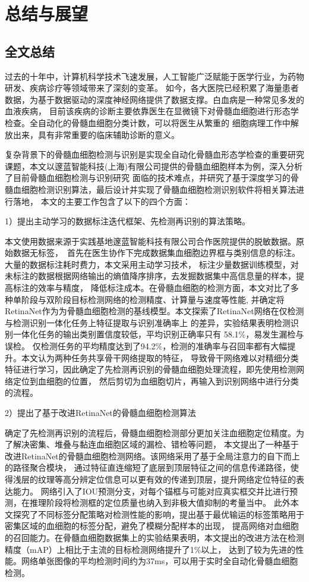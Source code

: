 \chapter{总结与展望}
\section{全文总结}
过去的十年中，计算机科学技术飞速发展，人工智能广泛赋能于医学行业，为药物研发、疾病诊疗等领域带来了深刻的变革。
如今，各大医院已经积累了海量患者数据，为基于数据驱动的深度神经网络提供了数据支撑。白血病是一种常见多发的血液疾病，
目前该疾病的诊断主要依靠医生在显微镜下对骨髓血细胞进行形态学检查。全自动化的骨髓血细胞分类计数，可以将医生从繁重的
细胞病理工作中解放出来，具有非常重要的临床辅助诊断的意义。

复杂背景下的骨髓血细胞检测与识别是实现全自动化骨髓血形态学检查的重要研究课题，本文以邃蓝智能科技(上海)有限公司提供的骨髓血细胞样本为例，深入分析了目前骨髓血细胞检测与识别研究
面临的技术难点，并研究了基于深度学习的骨髓血细胞检测识别算法，最后设计并实现了骨髓血细胞检测识别软件将相关算法进行落地，
本文的主要工作包含了以下的四个方面：

1）提出主动学习的数据标注迭代框架、先检测再识别的算法策略。

本文使用数据来源于实践基地邃蓝智能科技有限公司合作医院提供的脱敏数据。原始数据无标签，\
首先在医生协作下完成数据集血细胞边界框与类别信息的标注。大量的数据标注耗时费力，本文采用主动学习技术，
标注少量数据训练模型，对未标注的数据根据网络输出的熵值降序排序，去发掘数据集中高信息量的样本，提高标注的效率与精度，
降低标注成本。在骨髓血细胞的检测方面，本文对比了多种单阶段与双阶段目标检测网络的检测精度、计算量与速度等性能,
并确定将RetinaNet作为为骨髓血细胞检测的基线模型。本文探索了RetinaNet网络在仅检测与检测识别一体化任务上特征提取与识别准确率上
的差异，实验结果表明检测识别一体化任务的输出类别置信度较低，平均识别正确率只有 58.1\%，易发生漏检与误检。
仅检测任务的平均精度达到了94.2\%，检测的准确率与召回率都有大幅提升。本文认为两种任务共享骨干网络提取的特征，
导致骨干网络难以对精细分类特征进行学习，因此确定了先检测再识别的骨髓血细胞处理流程，即先使用检测网络定位到血细胞的位置，
然后剪切为血细胞切片，再输入到识别网络中进行分类的流程。

2）提出了基于改进RetinaNet的骨髓血细胞检测算法

确定了先检测再识别的流程后，骨髓血细胞检测部分更加关注血细胞定位精度。为了解决密集、堆叠与黏连血细胞区域的漏检、错检等问题，
本文提出了一种基于改进RetinaNet的骨髓血细胞检测网络。该网络采用了基于全局注意力的自下而上的路径聚合模块，
通过特征直连缩短了底层到顶层特征之间的信息传递路径，使得浅层的纹理等高分辨定位信息可以更有效的传递到顶层，提升网络定位特征的表达能力。
网络引入了IOU预测分支，对每个锚框与可能对应真实框交并比进行预测，在推理阶段将检测框的定位质量也纳入到非极大值抑制的考量当中。
此外本文探究了不同标签分配策略对检测性能的影响，提出基于最优输运的标签策略用于密集区域的血细胞的标签分配，避免了模糊分配样本的出现，
提高网络对血细胞的召回能力。在骨髓血细胞数据集上的实验结果表明，本文提出的改进方法在检测精度（mAP）上相比于主流的目标检测网络提升了1\%以上，
达到了较为先进的性能。网络单张图像的平均检测时间约为37ms，可以用于实时全自动化骨髓血细胞检测。

